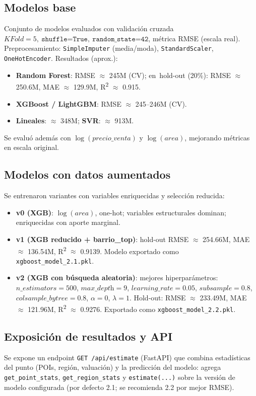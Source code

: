 \subsection*{Modelos base}
Conjunto de modelos evaluados con validación cruzada \(KFold=5,\ \texttt{shuffle=True},\ \texttt{random\_state=42}\), métrica RMSE (escala real). Preprocesamiento: \texttt{SimpleImputer} (media/moda), \texttt{StandardScaler}, \texttt{OneHotEncoder}. Resultados (aprox.):
\begin{itemize}
    \item \textbf{Random Forest}: RMSE \(\approx\) 245M (CV); en\ hold-out (20\%): RMSE \(\approx\) 250.6M, MAE \(\approx\) 129.9M, R\textsuperscript{2} \(\approx\) 0.915.
    \item \textbf{XGBoost / LightGBM}: RMSE \(\approx\) 245--246M (CV).
    \item \textbf{Lineales}: \(\approx\) 348M; \textbf{SVR}: \(\approx\) 913M.
\end{itemize}
Se evaluó además con \(\log(\textit{precio\_venta})\) y \(\log(\textit{area})\), mejorando métricas en escala original.

\subsection*{Modelos con datos aumentados}
Se entrenaron variantes con variables enriquecidas y selección reducida:
\begin{itemize}
    \item \textbf{v0 (XGB)}: \(\log(\textit{area})\), one-hot; variables estructurales dominan; enriquecidas con aporte marginal.
    \item \textbf{v1 (XGB reducido + barrio\_top)}: hold-out RMSE \(\approx\) 254.66M, MAE \(\approx\) 136.54M, R\textsuperscript{2} \(\approx\) 0.9139. Modelo exportado como \texttt{xgboost\_model\_2.1.pkl}.
    \item \textbf{v2 (XGB con búsqueda aleatoria)}: mejores hiperparámetros: \(n\_\textit{estimators}=500\), \(\textit{max\_depth}=9\), \(\textit{learning\_rate}=0.05\), \(\textit{subsample}=0.8\), \(\textit{colsample\_bytree}=0.8\), \(\alpha=0\), \(\lambda=1\). Hold-out: RMSE \(\approx\) 233.49M, MAE \(\approx\) 121.96M, R\textsuperscript{2} \(\approx\) 0.9276. Exportado como \texttt{xgboost\_model\_2.2.pkl}.
\end{itemize}

\subsection*{Exposición de resultados y API}
Se expone un endpoint \texttt{GET /api/estimate} (FastAPI) que combina estadísticas del punto (POIs, región, valuación) y la predicción del modelo: agrega \texttt{get\_point\_stats}, \texttt{get\_region\_stats} y \texttt{estimate(...)} sobre la versión de modelo configurada (por defecto 2.1; se recomienda 2.2 por mejor RMSE).

